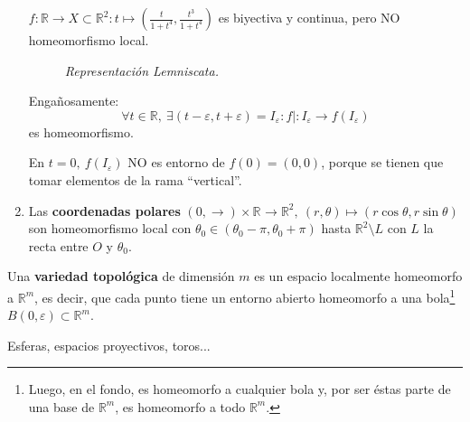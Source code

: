 \begin{ej}[¡Importantes!]
\begin{enumerate}
    $f: \mathbb{R} \rightarrow X \subset \mathbb{R}^2: t \mapsto \left( \frac{t}{1 + t^4}, \frac{t^3}{1 + t^4} \right)$ es biyectiva y continua, pero NO homeomorfismo local.
    \begin{figure}[H]
        \centering
        \caption{\textit{Representación Lemniscata.}}
        \label{fig:lemniscata}
    \end{figure}

    Engañosamente: 
    \[
        \forall t \in \mathbb{R},\ \exists \left( t - \varepsilon, t + \varepsilon \right) = I_{\varepsilon}: f| : I_{\varepsilon} \rightarrow f\left( I_{\varepsilon} \right) 
    \]
    es homeomorfismo.

    En $t = 0,\ f\left( I_{\varepsilon} \right)$ NO es entorno de $f\left( 0 \right) = \left( 0, 0 \right)$, porque se tienen que tomar elementos de la rama ``vertical''.

    \item Las \textbf{coordenadas polares} $\left( 0, \rightarrow \right) \times \mathbb{R}^{} \rightarrow \mathbb{R}^{2},\ \left( r, \theta \right) \mapsto \left( r\cos \theta, r \sin \theta \right)$ son homeomorfismo local con $\theta_0 \in \left( \theta_0 - \pi, \theta_0 + \pi \right)$ hasta $\mathbb{R}^{2} \setminus L$ con $L$ la recta entre $O$ y $\theta_0$.
\end{enumerate} 
\end{ej}

\begin{defi}
Una \textbf{variedad topológica} de dimensión $m$ es un espacio localmente homeomorfo a $\mathbb{R}^m$, es decir, que cada punto tiene un entorno abierto homeomorfo a una bola\footnote{Luego, en el fondo, es homeomorfo a cualquier bola y, por ser éstas parte de una base de $\mathbb{R}^m$, es homeomorfo a todo $\mathbb{R}^m$.} $B\left( 0, \varepsilon \right) \subset \mathbb{R}^m$.
\end{defi}
\begin{ej}
Esferas, espacios proyectivos, toros...
\end{ej}

